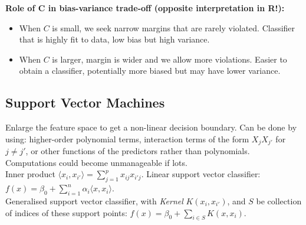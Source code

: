 \documentclass[11pt]{article}
\begin{document}
\noindent \textbf{Role of $\boldsymbol{C}$ in bias-variance trade-off (opposite interpretation in R!):}
\begin{itemize}
    \item When $C$ is small, we seek narrow margins that are rarely violated. Classifier that is highly fit to data, low bias but high variance.
    \item When $C$ is larger, margin is wider and we allow more violations. Easier to obtain a classifier, potentially more biased but may have lower variance.
\end{itemize}

\subsection{Support Vector Machines}

Enlarge the feature space to get a non-linear decision boundary. Can be done by using: higher-order polynomial terms, interaction terms of the form $X_j X_{j'}$ for $j \neq j'$, or other functions of the predictors rather than polynomials. Computations could become unmanageable if lots. \\

\noindent Inner product $\langle x_i, x_{i'} \rangle = \sum_{j=1}^{p}x_{ij}x_{i'j}$. Linear support vector classifier: $f(x) = \beta_0 + \sum_{i=1}^{n}{\alpha_{i}\langle x, x_{i} \rangle}$. \\

\noindent Generalised support vector classifier, with \textit{Kernel} $K(x_i, x_{i'})$, and $S$ be collection of indices of these support points: $f(x) = \beta_0 + \sum_{i \in S}{K(x, x_{i})}$. \\
\end{document}
